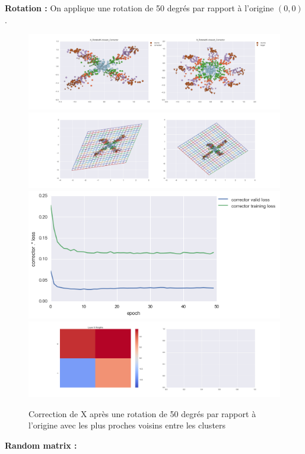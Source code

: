 
{\Large \textbf{Rotation :}} On applique une rotation de 50 degrés par rapport à l'origine $(0,0)$.

\begin{figure}[H] %
\centering
\includegraphics[width=\linewidth]{fig/24-05-2016/X/X_RotatedK-closest_Corrector-DATA.png}
\includegraphics[width=\linewidth]{fig/24-05-2016/X/X_RotatedK-closest_Corrector-GridCheck.png}
\includegraphics[width=0.45\linewidth]{fig/24-05-2016/X/X_RotatedK-closest_Corrector-Learning_curve.png}
\includegraphics[width=\linewidth]{fig/24-05-2016/X/X_RotatedK-closest_Corrector-W.png}
\caption{Correction de X après une rotation de 50 degrés par rapport à l'origine avec les plus proches voisins entre les clusters}
\label{fig:recap-X-rot-exhaustive}
\end{figure}

{\Large \textbf{Random matrix :}}

